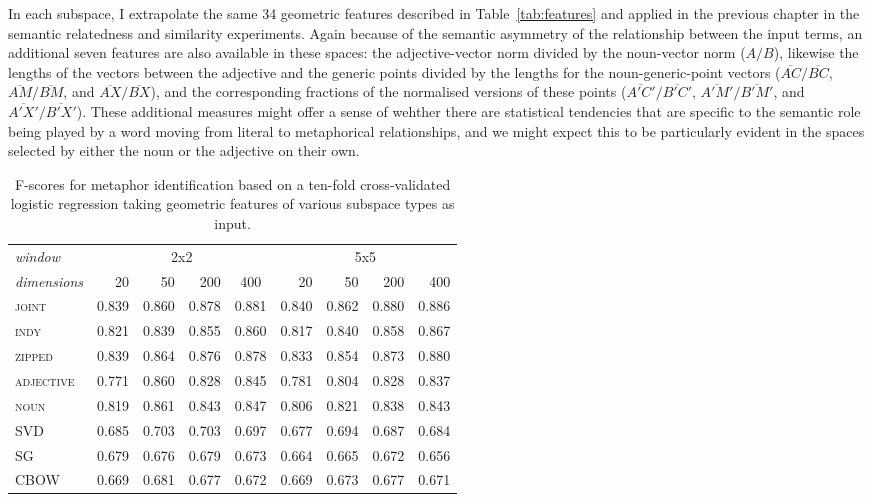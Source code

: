 In each subspace, I extrapolate the same 34 geometric features described in Table~\ref{tab:features} and applied in the previous chapter in the semantic relatedness and similarity experiments.  Again because of the semantic asymmetry of the relationship between the input terms, an additional seven features are also available in these spaces: the adjective-vector norm divided by the noun-vector norm ($A/B$), likewise the lengths of the vectors between the adjective and the generic points divided by the lengths for the noun-generic-point vectors ($\overline{AC}/\overline{BC}$, $\overline{AM}/\overline{BM}$, and $\overline{AX}/\overline{BX}$), and the corresponding fractions of the normalised versions of these points ($\overline{A'C'}/\overline{B'C'}$, $\overline{A'M'}/\overline{B'M'}$, and $\overline{A'X'}/\overline{B'X'}$).  These additional measures might offer a sense of wehther there are statistical tendencies that are specific to the semantic role being played by a word moving from literal to metaphorical relationships, and we might expect this to be particularly evident in the spaces selected by either the noun or the adjective on their own.

\begin{table}
\centering
\begin{tabular}{lrrrr|rrrr}
\hline
\emph{window} & \multicolumn{4}{c}{2x2} & \multicolumn{4}{c}{5x5} \\
\emph{dimensions} & 20 & 50 & 200 & \multicolumn{1}{c}{400} & 20 & 50 & 200 & 400 \\
\hline
\textsc{joint} & 0.839 & 0.860 & 0.878 & 0.881 & 0.840 & 0.862 & 0.880 & 0.886 \\
\textsc{indy} & 0.821 & 0.839 & 0.855 & 0.860 & 0.817 & 0.840 & 0.858 & 0.867 \\
\textsc{zipped} & 0.839 & 0.864 & 0.876 & 0.878 & 0.833 & 0.854 & 0.873 & 0.880 \\
\textsc{adjective} & 0.771 & 0.860 & 0.828 & 0.845 & 0.781 & 0.804 & 0.828 & 0.837 \\
\textsc{noun} & 0.819 & 0.861 & 0.843 & 0.847 & 0.806 & 0.821 & 0.838 & 0.843 \\
\textsc{SVD} & 0.685 & 0.703 & 0.703 & 0.697 & 0.677 & 0.694 & 0.687 & 0.684 \\
\textsc{SG} & 0.679 & 0.676 & 0.679 & 0.673 & 0.664 & 0.665 & 0.672 & 0.656 \\
\textsc{CBOW} & 0.669 & 0.681 & 0.677 & 0.672 & 0.669 & 0.673 & 0.677 & 0.671 \\
\hline
\end{tabular}
\caption{F-scores for metaphor identification based on a ten-fold cross-validated logistic regression taking geometric features of various subspace types as input.}
\label{tab:metaphor}
\end{table}

